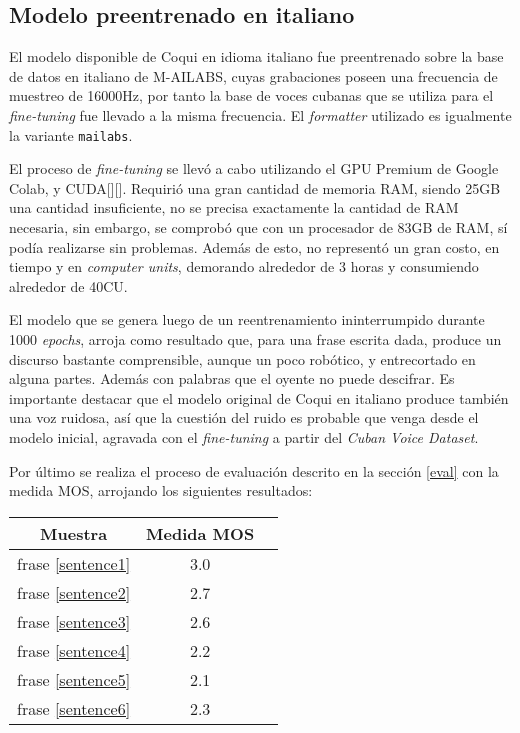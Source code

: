 \subsection{Modelo preentrenado en italiano}
El modelo disponible de Coqui en idioma italiano fue preentrenado sobre la base de datos en italiano de M-AILABS, cuyas grabaciones poseen una frecuencia de muestreo de 16000Hz, por tanto la base de voces cubanas que se utiliza para el \textit{fine-tuning} fue llevado a la misma frecuencia.
El \textit{formatter} utilizado es igualmente la variante \texttt{mailabs}.

El proceso de \textit{fine-tuning} se llevó a cabo utilizando el GPU Premium de Google Colab, y CUDA[\cite{cuda}][\cite{cuda1}]. Requirió una gran cantidad de memoria RAM, siendo 25GB una cantidad insuficiente, no se precisa exactamente la cantidad de RAM necesaria, sin embargo, se comprobó que con un procesador de 83GB de RAM, sí podía realizarse sin problemas. Además de esto, no representó un gran costo, en tiempo y en \textit{computer units}, demorando alrededor de 3 horas y consumiendo alrededor de 40CU.

El modelo que se genera luego de un reentrenamiento ininterrumpido durante 1000 \textit{epochs}, arroja como resultado que, para una frase escrita dada, produce un discurso bastante comprensible, aunque un poco robótico, y entrecortado en alguna partes. Además con palabras que el oyente no puede descifrar. Es importante destacar que el modelo original de Coqui en italiano produce también una voz ruidosa, así que la cuestión del ruido es probable que venga desde el modelo inicial, agravada con el \textit{fine-tuning} a partir del \textit{Cuban Voice Dataset}.

Por último se realiza el proceso de evaluación descrito en la sección \ref{eval} con la medida MOS, arrojando los siguientes resultados:

\begin{center} \begin{tabular}{ |c|c|c| } 
		\hline 
		Muestra & Medida MOS \\
		\hline
		frase \ref{sentence1} & 3.0 \\
		frase \ref{sentence2} & 2.7 \\
		frase \ref{sentence3} & 2.6 \\
		frase \ref{sentence4} & 2.2 \\
		frase \ref{sentence5} & 2.1 \\
		frase \ref{sentence6} & 2.3 \\
		\hline 
	\end{tabular} 
\end{center}

